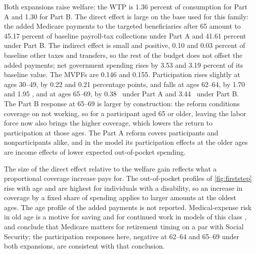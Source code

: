 Both expansions raise welfare: the WTP is 1.36 percent of consumption for Part A and 1.30 for Part B. %
The direct effect is large on the base used for this family: the added Medicare payments to the targeted beneficiaries after 65 amount to 45.17 percent of baseline payroll-tax collections under Part A and 41.61 percent under Part B. %
The indirect effect is small and positive, 0.10 and 0.03 percent of baseline other taxes and transfers, so the rest of the budget does not offset the added payments; net government spending rises by 3.53 and 3.19 percent of its baseline value. %
The MVPFs are 0.146 and 0.155. %
Participation rises slightly at ages 30--49, by 0.22 and 0.21 percentage points, and falls at ages 62--64, by 1.70 and 1.95 \pp, and at ages 65--69, by 0.38 \pp\ under Part A and 3.44 \pp\ under Part B. %
The Part B response at 65--69 is larger by construction: the reform conditions coverage on not working, so for a participant aged 65 or older, leaving the labor force now also brings the higher coverage, which lowers the return to participation at those ages. The Part A reform covers participants and nonparticipants alike, and in the model its participation effects at the older ages are income effects of lower expected out-of-pocket spending. %

The size of the direct effect relative to the welfare gain reflects what a proportional coverage increase pays for. The out-of-pocket profiles of \autoref{fig:firststep} rise with age and are highest for individuals with a disability, so an increase in coverage by a fixed share of spending applies to larger amounts at the oldest ages. The age profile of the added payments is not reported. Medical-expense risk in old age is a motive for saving and for continued work in models of this class \citep{Denardi2010,Denardi2018}, and \citet{french2011effects} conclude that Medicare matters for retirement timing on a par with Social Security; the participation responses here, negative at 62--64 and 65--69 under both expansions, are consistent with that conclusion. %

